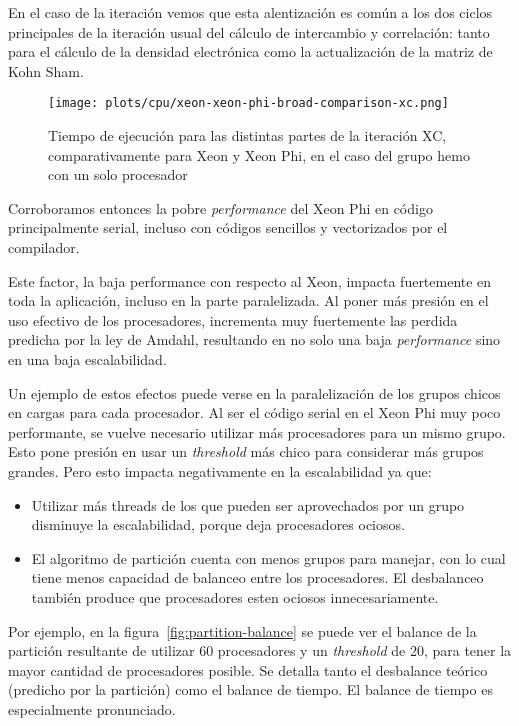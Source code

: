 En el caso de la iteraci\'on vemos que esta alentizaci\'on es com\'un a los dos
ciclos principales de la iteraci\'on usual del c\'alculo de intercambio y
correlaci\'on: tanto para el c\'alculo de la densidad electr\'onica como la
actualizaci\'on de la matriz de Kohn Sham.

\begin{figure}[htbp]
   \centering
   \texttt{[image: plots/cpu/xeon-xeon-phi-broad-comparison-xc.png]}
   \caption{Tiempo de ejecuci\'on para las distintas partes de la iteraci\'on XC,
   comparativamente para Xeon y Xeon Phi, en el caso del grupo hemo con un solo procesador}
   \label{fig:prelim-xeon-phi-xc}
\end{figure}

Corroboramos entonces la pobre \textit{performance} del Xeon Phi en c\'odigo
principalmente serial, incluso con c\'odigos sencillos y vectorizados por el
compilador.

Este factor, la baja performance con respecto al Xeon, impacta fuertemente en toda
la aplicaci\'on, incluso en la parte paralelizada. Al poner m\'as presi\'on en
el uso efectivo de los procesadores, incrementa muy fuertemente las perdida
predicha por la ley de Amdahl, resultando en no solo una baja \textit{performance}
sino en una baja escalabilidad.

Un ejemplo de estos efectos puede verse en la paralelizaci\'on de los grupos chicos
en cargas para cada procesador. Al ser el c\'odigo serial en el Xeon Phi muy poco
performante, se vuelve necesario utilizar m\'as procesadores para un mismo grupo.
Esto pone presi\'on en usar un \textit{threshold} m\'as chico para considerar
m\'as grupos grandes. Pero esto impacta negativamente en la escalabilidad ya que:

\begin{itemize}
    \item Utilizar m\'as threads de los que pueden ser aprovechados por un grupo
    disminuye la escalabilidad, porque deja procesadores ociosos.
    \item El algoritmo de partici\'on cuenta con menos grupos para manejar, con
    lo cual tiene menos capacidad de balanceo entre los procesadores. El
    desbalanceo tambi\'en produce que procesadores esten ociosos innecesariamente.
\end{itemize}

Por ejemplo, en la figura~\ref{fig:partition-balance} se puede ver el balance
de la partici\'on resultante de utilizar 60 procesadores y un \textit{threshold}
de 20, para tener la mayor cantidad de procesadores posible. Se detalla tanto
el desbalance te\'orico (predicho por la partici\'on) como el balance de tiempo.
El balance de tiempo es especialmente pronunciado.

